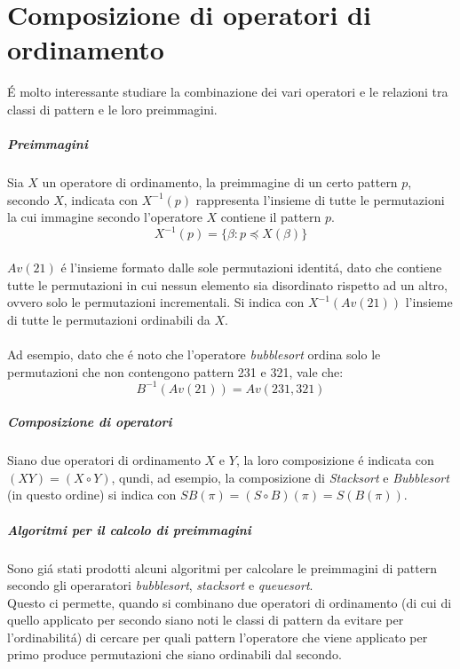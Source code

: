 \chapter{Composizione di operatori di ordinamento}
\'E molto interessante studiare la combinazione dei vari operatori e le relazioni tra classi di pattern e le loro preimmagini.
\paragraph*{Preimmagini} Sia $X$ un operatore di ordinamento, la preimmagine di un certo pattern $p$, secondo $X$, indicata con $X^{-1}(p)$ rappresenta l'insieme di tutte le permutazioni la cui immagine secondo l'operatore $X$ contiene il pattern $p$.$$X^{-1}(p) = \{\beta : p\preceq X(\beta)\}$$\\
$Av(21)$ \'e l'insieme formato dalle sole permutazioni identit\'a, dato che contiene tutte le permutazioni in cui nessun elemento sia disordinato rispetto ad un altro, ovvero solo le permutazioni incrementali. Si indica con $X^{-1}(Av(21))$ l'insieme di tutte le permutazioni ordinabili da $X$.\\\\
Ad esempio, dato che \'e noto che l'operatore \textit{bubblesort} ordina solo le permutazioni che non contengono pattern 231 e 321, vale che:$$B^{-1}(Av(21)) = Av(231,321)$$
\paragraph*{Composizione di operatori} Siano due operatori di ordinamento $X$ e $Y$, la loro composizione \'e indicata con $( XY ) = ( X \circ Y )$, qundi, ad esempio, la composizione di \textit{Stacksort} e \textit{Bubblesort} (in questo ordine) si indica con $SB(\pi) = (S \circ B)(\pi) = S(B(\pi))$.
\paragraph*{Algoritmi per il calcolo di preimmagini} Sono gi\'a stati prodotti alcuni algoritmi per calcolare le preimmagini di pattern secondo gli operaratori \textit{bubblesort}\cite{albert2010inverse}, \textit{stacksort}\cite{claesson2012sorting} e \textit{queuesort}\cite{magnusson2013sorting}\cite{cioni2021characterization}.\\
Questo ci permette, quando si combinano due operatori di ordinamento (di cui di quello applicato per secondo siano noti le classi di pattern da evitare per l'ordinabilit\'a) di cercare per quali pattern l'operatore che viene applicato per primo produce permutazioni che siano ordinabili dal secondo.
